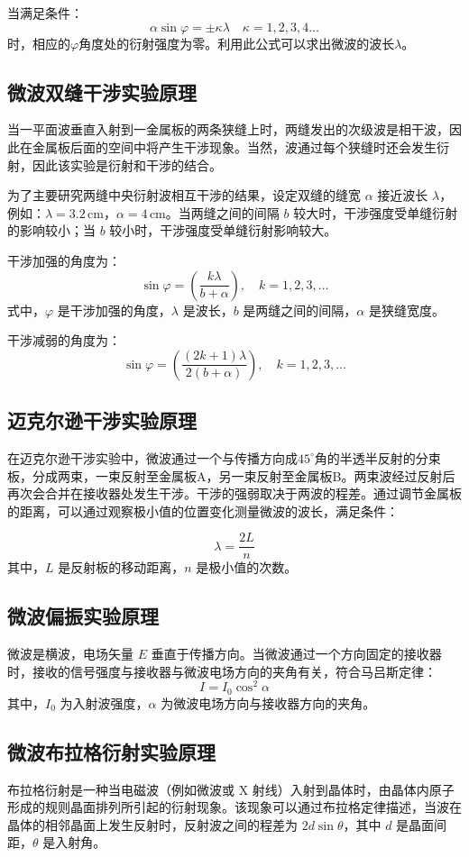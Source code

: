 \documentclass[zihao=5, UTF8]{article}
\theoremstyle{MyLineTheoremStyle} %
\theoremstyle{MyBlockTheoremStyle} %
\theoremstyle{MySubsubsectionStyle} %
\begin{document}
当满足条件：
\[
\alpha \sin \varphi = \pm \kappa \lambda \quad \kappa = 1, 2, 3, 4 \ldots
\]
时，相应的$\varphi$角度处的衍射强度为零。利用此公式可以求出微波的波长$\lambda$。

\subsection{微波双缝干涉实验原理}
当一平面波垂直入射到一金属板的两条狭缝上时，两缝发出的次级波是相干波，因此在金属板后面的空间中将产生干涉现象。当然，波通过每个狭缝时还会发生衍射，因此该实验是衍射和干涉的结合。

为了主要研究两缝中央衍射波相互干涉的结果，设定双缝的缝宽 $\alpha$ 接近波长 $\lambda$，例如：$\lambda = 3.2 \, \text{cm}$，$\alpha = 4 \, \text{cm}$。当两缝之间的间隔 $b$ 较大时，干涉强度受单缝衍射的影响较小；当 $b$ 较小时，干涉强度受单缝衍射影响较大。

干涉加强的角度为：
\[
\sin \varphi = \left( \frac{k \lambda}{b + \alpha} \right), \quad k = 1, 2, 3, \ldots
\]
式中，$\varphi$ 是干涉加强的角度，$\lambda$ 是波长，$b$ 是两缝之间的间隔，$\alpha$ 是狭缝宽度。

干涉减弱的角度为：
\[
\sin \varphi = \left( \frac{\left( 2k + 1 \right) \lambda}{2(b + \alpha)} \right), \quad k = 1, 2, 3, \ldots
\]

\subsection{迈克尔逊干涉实验原理}
在迈克尔逊干涉实验中，微波通过一个与传播方向成$45^\circ$角的半透半反射的分束板，分成两束，一束反射至金属板A，另一束反射至金属板B。两束波经过反射后再次会合并在接收器处发生干涉。干涉的强弱取决于两波的程差。通过调节金属板的距离，可以通过观察极小值的位置变化测量微波的波长，满足条件：

\[
\lambda = \frac{2L}{n}
\]
其中，$L$ 是反射板的移动距离，$n$ 是极小值的次数。

\subsection{微波偏振实验原理}
微波是横波，电场矢量 $E$ 垂直于传播方向。当微波通过一个方向固定的接收器时，接收的信号强度与接收器与微波电场方向的夹角有关，符合马吕斯定律：
\[
I = I_0 \cos^2 \alpha
\]
其中，$I_0$ 为入射波强度，$\alpha$ 为微波电场方向与接收器方向的夹角。

\subsection{微波布拉格衍射实验原理}
布拉格衍射是一种当电磁波（例如微波或 X 射线）入射到晶体时，由晶体内原子形成的规则晶面排列所引起的衍射现象。该现象可以通过布拉格定律描述，当波在晶体的相邻晶面上发生反射时，反射波之间的程差为 $2d\sin\theta$，其中 $d$ 是晶面间距，$\theta$ 是入射角。
\end{document}
